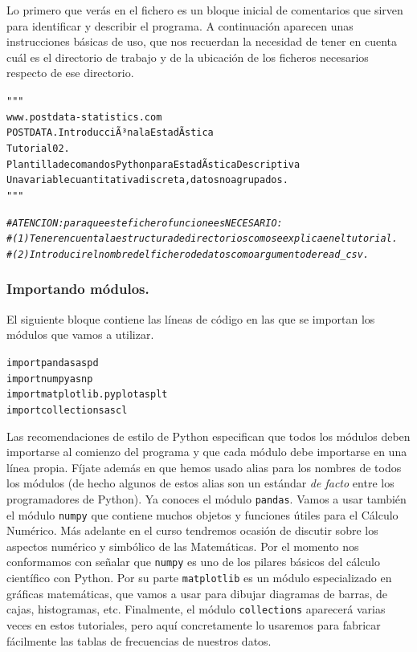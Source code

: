 \documentclass[10pt,a4paper]{article}\usepackage[]{graphicx}\usepackage[]{color}
\makeatletter
\newcommand{\hlstr}[1]{\textcolor[rgb]{0.192,0.494,0.8}{#1}}%
\newcommand{\hlcom}[1]{\textcolor[rgb]{0.678,0.584,0.686}{\textit{#1}}}%
\newenvironment{kframe}{%
 \def\at@end@of@kframe{}%
 \ifinner\ifhmode%
  \def\at@end@of@kframe{\end{minipage}}%
  \begin{minipage}{\columnwidth}%
 \fi\fi%
 \def\FrameCommand##1{\hskip\@totalleftmargin \hskip-\fboxsep
 \colorbox{shadecolor}{##1}\hskip-\fboxsep
     \hskip-\linewidth \hskip-\@totalleftmargin \hskip\columnwidth}%
 \MakeFramed {\advance\hsize-\width
   \@totalleftmargin\z@ \linewidth\hsize
   \@setminipage}}%
 {\par\unskip\endMakeFramed%
 \at@end@of@kframe}
\newenvironment{knitrout}{}{} %
\newcounter {cont01}
\makeatother
\begin{document}
Lo primero que verás en el fichero es un bloque inicial de comentarios que sirven para identificar y describir el programa. A continuación aparecen unas instrucciones básicas de uso, que nos recuerdan la necesidad de tener en cuenta cuál es el directorio de trabajo y de la ubicación de los ficheros necesarios respecto de ese directorio.
\begin{knitrout}
\color{fgcolor}\begin{kframe}
\begin{alltt}
\hlstr{""}"
www.postdata-statistics.com
POSTDATA. IntroducciÃ³n a la EstadÃ­stica
Tutorial 02.  
Plantilla de comandos Python para EstadÃ­stica Descriptiva
Una variable cuantitativa discreta, datos no agrupados.
\hlstr{""}"


\hlcom{# ATENCION: para que este fichero funcione es NECESARIO: }
\hlcom{# (1) Tener en cuenta la estructura de directorios como se explica en el tutorial. }
\hlcom{# (2) Introducir el nombre del fichero de datos como argumento de read_csv.}
\end{alltt}
\end{kframe}
\end{knitrout}

\subsubsection*{Importando módulos.}
\label{tut02:subsubsec:importandoModulos}

El siguiente bloque contiene las líneas de código en las que se importan los módulos que vamos a utilizar.
\begin{knitrout}
\color{fgcolor}\begin{kframe}
\begin{alltt}
import pandas as pd 
import numpy as np 
import matplotlib.pyplot as plt 
import collections as cl 
\end{alltt}
\end{kframe}
\end{knitrout}
Las recomendaciones de estilo de Python especifican que todos los módulos deben importarse al comienzo del programa y que cada módulo debe importarse en una línea propia. Fíjate además en que hemos usado alias para los nombres de todos los módulos (de hecho algunos de estos alias son un estándar {\em de facto} entre los programadores de Python). Ya conoces el módulo {\tt pandas}. Vamos a usar también el módulo {\tt numpy} que contiene muchos objetos y funciones útiles para el Cálculo Numérico. Más adelante en el curso tendremos ocasión de discutir sobre los aspectos numérico y simbólico de las Matemáticas. Por el momento nos conformamos con señalar que {\tt numpy} es uno de los pilares básicos del cálculo científico con Python. Por su parte {\tt matplotlib} es un módulo especializado en gráficas matemáticas, que vamos a usar para dibujar diagramas de barras, de cajas, histogramas, etc. Finalmente, el módulo {\tt collections} aparecerá varias veces en estos tutoriales, pero aquí concretamente lo usaremos para fabricar fácilmente las tablas de frecuencias de nuestros datos.
\end{document}
